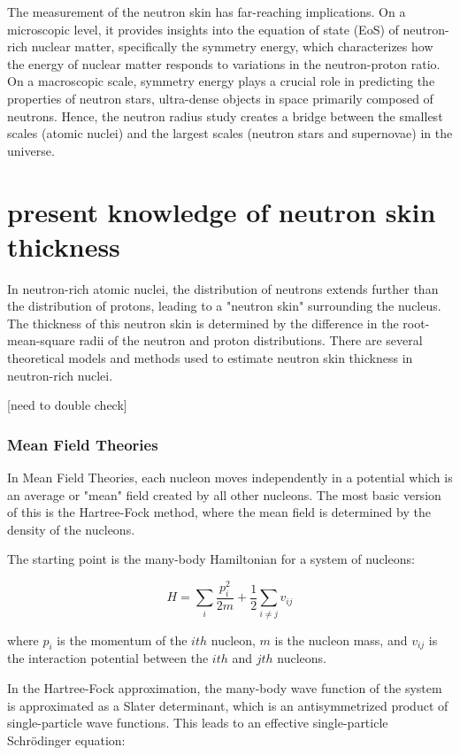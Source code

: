 The measurement of the neutron skin has far-reaching implications. On a microscopic level, it provides insights into the equation of state (EoS) of neutron-rich nuclear matter, specifically the symmetry energy, which characterizes how the energy of nuclear matter responds to variations in the neutron-proton ratio. On a macroscopic scale, symmetry energy plays a crucial role in predicting the properties of neutron stars, ultra-dense objects in space primarily composed of neutrons. Hence, the neutron radius study creates a bridge between the smallest scales (atomic nuclei) and the largest scales (neutron stars and supernovae) in the universe.

\section{present knowledge of neutron skin thickness}

In neutron-rich atomic nuclei, the distribution of neutrons extends further than the distribution of protons, leading to a "neutron skin" surrounding the nucleus. The thickness of this neutron skin is determined by the difference in the root-mean-square radii of the neutron and proton distributions. There are several theoretical models and methods used to estimate neutron skin thickness in neutron-rich nuclei.

[need to double check]

\subsubsection{Mean Field Theories}

In Mean Field Theories, each nucleon moves independently in a potential which is an average or "mean" field created by all other nucleons. The most basic version of this is the Hartree-Fock method, where the mean field is determined by the density of the nucleons.

The starting point is the many-body Hamiltonian for a system of nucleons:

\begin{equation}
    H = \sum_i\frac{p_i^2}{2m} + \frac{1}{2}\sum_{i\neq j}v_{ij}
\end{equation}

where $p_i$ is the momentum of the $ith$ nucleon, $m$ is the nucleon mass, and $v_{ij}$ is the interaction potential between the $ith$ and $jth$ nucleons.

In the Hartree-Fock approximation, the many-body wave function of the system is approximated as a Slater determinant, which is an antisymmetrized product of single-particle wave functions. This leads to an effective single-particle Schrödinger equation:

